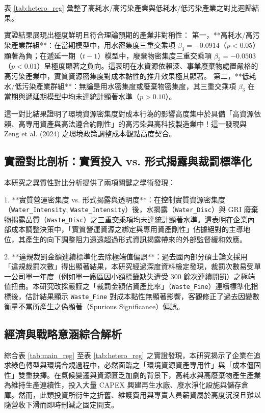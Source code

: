 \documentclass[12pt,a4paper]{article}
\begin{document}
表 \ref{tab:hetero_reg} 彙整了高耗水/高污染產業與低耗水/低污染產業之對比迴歸結果。

實證結果展現出極度鮮明且符合理論預期的產業非對稱性：
第一，**高耗水/高污染產業群組**：在當期模型中，用水密集度三重交乘項 $\beta_3 = -0.0914$（$p < 0.05$）顯著為負；在遞延一期（$t-1$）模型中，廢棄物密集度三重交乘項 $\beta_3 = -0.0503$（$p < 0.01$）呈極度顯著之負向。這表明在水資源依賴深、事業廢棄物處置嚴格的高污染產業中，實質資源密集度對成本黏性的推升效果極其顯著。
第二，**低耗水/低污染產業群組**：無論是用水密集度或廢棄物密集度，其三重交乘項 $\beta_3$ 在當期與遞延期模型中均未達統計顯著水準（$p > 0.10$）。

這一對比結果證明了環境資源密集度對成本行為的影響高度集中於具備「高資源依賴、高專用資產與高法遵合約剛性」的高污染與高科技製造業中！這一發現與 Zeng et al. (2024) 之環境政策調整成本觀點高度契合。

\subsection{實證對比剖析：實質投入 vs. 形式揭露與裁罰標準化}

本研究之異質性對比分析提供了兩項關鍵之學術發現：

1. **實質營運密集度 vs. 形式揭露與透明度**：在控制實質資源密集度（\texttt{Water\_Intensity}, \texttt{Waste\_Intensity}）後，水揭露（\texttt{Water\_Disc}）與 GRI 廢棄物揭露品質（\texttt{Waste\_Disc}）之三重交乘項均未達統計顯著水準。這表明在企業內部成本調整決策中，「實質營運資源之綁定與專用資產剛性」佔據絕對的主導地位，其產生的向下調整阻力遠遠超過形式資訊揭露帶來的外部監督緩和效應。

2. **違規裁罰金額連續標準化去除極端值偏誤**：過去國內部分碩士論文採用「違規裁罰次數」得出顯著結果，本研究經過深度資料檢定發現，裁罰次數易受單一公司單一年度（例如單一廠區因小額標籤缺失遭受 300 餘次連續開罰）之極端值扭曲。本研究改採嚴謹之「裁罰金額佔資產比率」（\texttt{Waste\_Fine}）連續標準化指標後，估計結果顯示 \texttt{Waste\_Fine} 對成本黏性無顯著影響，客觀修正了過去因變數衡量不當所產生之偽顯著（Spurious Significance）偏誤。

\subsection{經濟與戰略意涵綜合解析}

綜合表 \ref{tab:main_reg} 至表 \ref{tab:hetero_reg} 之實證發現，本研究揭示了企業在追求綠色轉型與環境合規過程中，必然面臨之「環境資源資產專用性」與「成本僵固性」雙重抉擇。在氣候變遷與資源匱乏加劇的背景下，高耗水與高廢棄物產生產業為維持生產連續性，投入大量 CAPEX 興建再生水廠、廢水淨化設施與儲存倉庫。然而，此類投資所衍生之折舊、維護費用與專責人員薪資屬於高度沉沒且難以隨營收下滑而即時刪減之固定開支。
\end{document}
